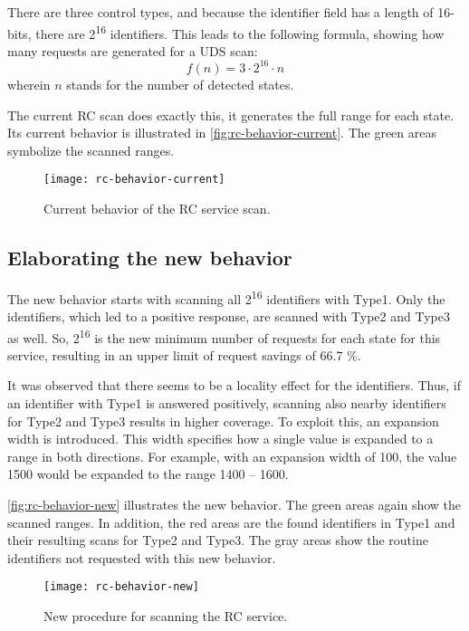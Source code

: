 There are three control types, and because the identifier field has a length of 16-bits, there are 2\textsuperscript{16} identifiers. This leads to the following formula, showing how many requests are generated for a UDS scan:
\[f(n)=3 \cdot 2^{16} \cdot n\]
wherein $n$ stands for the number of detected states.

The current RC scan does exactly this, it generates the full range for each state. Its current behavior is illustrated in \autoref{fig:rc-behavior-current}. The green areas symbolize the scanned ranges.

\begin{figure}[h]
    \centering
    \texttt{[image: rc-behavior-current]}
    \caption{Current behavior of the RC service scan.}
    \label{fig:rc-behavior-current}
\end{figure}

\subsection{Elaborating the new behavior}
\label{subsubsec:rc-elaborating}

The new behavior starts with scanning all 2\textsuperscript{16} identifiers with Type1. Only the identifiers, which led to a positive response, are scanned with Type2 and Type3 as well. So, 2\textsuperscript{16} is the new minimum number of requests for each state for this service, resulting in an upper limit of request savings of 66.7 \%.

It was observed that there seems to be a locality effect for the identifiers. Thus, if an identifier with Type1 is answered positively, scanning also nearby identifiers for Type2 and Type3 results in higher coverage. To exploit this, an expansion width is introduced. This width specifies how a single value is expanded to a range in both directions. For example, with an expansion width of 100, the value 1500 would be expanded to the range 1400 – 1600.

\autoref{fig:rc-behavior-new} illustrates the new behavior. The green areas again show the scanned ranges. In addition, the red areas are the found identifiers in Type1 and their resulting scans for Type2 and Type3. The gray areas show the routine identifiers not requested with this new behavior.

\begin{figure}[h]
    \centering
    \texttt{[image: rc-behavior-new]}
    \caption{New procedure for scanning the RC service.}
    \label{fig:rc-behavior-new}
\end{figure}

